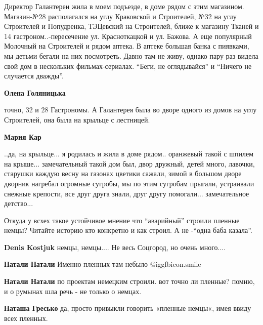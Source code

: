 \begin{itemize}

Директор Галантереи жила в моем подъезде, в доме рядом с этим магазином.
Магазин-№28 располагался на углу Краковской и Строителей, №32 на углу
Строителей и Попудренка, ТЭЦевский на Строителей, ближе к магазину Тканей и 14
гастроном..-пересечение ул. Красноткацкой и ул. Бажова. А еще популярный
Молочный на Строителей и рядом аптека. В аптеке большая банка с пиявками, мы
детьми бегали на них посмотреть. Давно там не живу, однако пару раз видела свой
дом в нескольких фильмах-сериалах. \enquote{Беги, не оглядывайся} и \enquote{Ничего не
случается дважды}.

\begin{itemize} %
\textbf{Олена Голяницька} 

точно, 32 и 28 Гастрономы. А Галантерея была во дворе одного из домов на углу
Строителей, она была на крыльце с лестницей.


\textbf{Мария Кар} 

..да, на крыльце... я родилась и жила в доме рядом.. оранжевый такой с шпилем на
крыше... замечательный такой дом был, двор дружный, детей много, лавочки,
старушки каждую весну на газонах цветики сажали, зимой в большом дворе дворник
нагребал огромные сугробы, мы по этим сугробам прыгали, устраивали снежные
крепости, все друг друга знали, друг другу помогали... замечательное детство...

\end{itemize} %


Откуда у всхех такое устойчивое мнение что \enquote{аварийный} строили пленные немцы?
Читайте историю кто конкретно и как строил. А не -\enquote{одна баба казала}.

\begin{itemize} %
\textbf{Denis Kostjuk} немцы, немцы.... Не весь Соцгород, но очень много....

\textbf{Натали Натали} Именно пленных там небыло  @igg{fbicon.smile} 

\textbf{Натали Натали} по проектам немецким строили. вот точно ли пленные? помню, и о румынах шла речь - не только о немцах.

\textbf{Наташа Гресько} да, просто привыкли говорить «пленные немцы«, имея ввиду всех пленных.
\end{itemize} %



\end{itemize}
